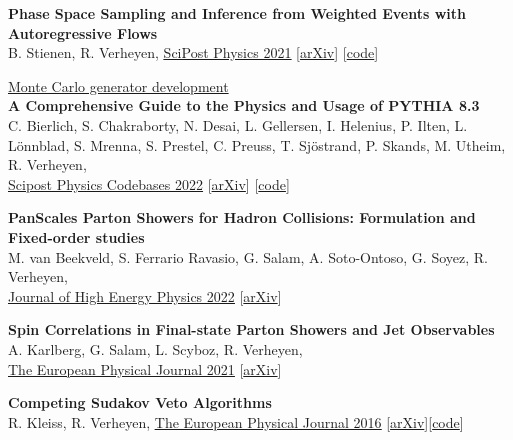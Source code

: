 \documentclass[a4paper,12pt]{article}
\begin{document}
\textbf{Phase Space Sampling and Inference from Weighted Events with Autoregressive Flows} \\
B. Stienen, R. Verheyen, 
\href{https://scipost.org/10.21468/SciPostPhys.10.2.038}{\underline{SciPost Physics 2021}} [\href{https://arxiv.org/pdf/2011.13445.pdf}{arXiv}] [\href{https://github.com/rbvh/PhaseSpaceAutoregressiveFlow}{code}]



\underline{\large{Monte Carlo generator development}} \\[5pt]
\textbf{A Comprehensive Guide to the Physics and Usage of PYTHIA 8.3} \\
C. Bierlich, S. Chakraborty, N. Desai, L. Gellersen, I. Helenius, P. Ilten, L. Lönnblad, S. Mrenna, S. Prestel, C. Preuss, T. Sjöstrand, P. Skands, M. Utheim, R. Verheyen, \\
\href{https://arxiv.org/abs/2203.11601}{\underline{Scipost Physics Codebases 2022}} [\href{https://arxiv.org/abs/2203.11601}{arXiv}] [\href{https://pythia.org}{code}]

\textbf{PanScales Parton Showers for Hadron Collisions: Formulation and Fixed-order studies} \\
M. van Beekveld, S. Ferrario Ravasio, G. Salam, A. Soto-Ontoso, G. Soyez, R. Verheyen, \\
\href{https://arxiv.org/abs/2205.02237}{\underline{Journal of High Energy Physics 2022}} [\href{https://arxiv.org/abs/2205.02237}{arXiv}]

\textbf{Spin Correlations in Final-state Parton Showers and Jet Observables} \\
A. Karlberg, G. Salam, L. Scyboz, R. Verheyen, \\
\href{https://link.springer.com/article/10.1140/epjc/s10052-021-09378-0}{\underline{The European Physical Journal 2021}} [\href{https://arxiv.org/pdf/2103.16526.pdf}{arXiv}]

\textbf{Competing Sudakov Veto Algorithms} \\
R. Kleiss, R. Verheyen,
\href{https://link.springer.com/article/10.1140/epjc/s10052-016-4231-5}{\underline{The European Physical Journal 2016}} [\href{https://arxiv.org/pdf/1605.09246.pdf}{arXiv}][\href{https://github.com/rbvh/Veto-Algorithm-Toy-Shower}{code}]



\end{document}
